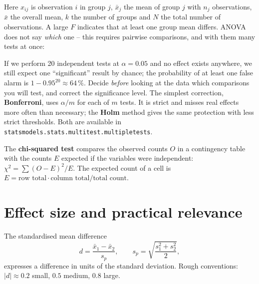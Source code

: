 \documentclass[
  letterpaper,
  DIV=11,
  numbers=noendperiod]{scrreprt}
\begin{document}
Here \(x_{ij}\) is observation \(i\) in group \(j\), \(\bar x_j\) the
mean of group \(j\) with \(n_j\) observations, \(\bar x\) the overall
mean, \(k\) the number of groups and \(N\) the total number of
observations. A large \(F\) indicates that at least one group mean
differs. ANOVA does not say \emph{which} one -- this requires pairwise
comparisons, and with them many tests at once:

\begin{tcolorbox}[enhanced jigsaw, left=2mm, title=\textcolor{quarto-callout-warning-color}{\faExclamationTriangle}\hspace{0.5em}{Pitfall: many tests, many false alarms}, opacityback=0, breakable, rightrule=.15mm, arc=.35mm, toptitle=1mm, colbacktitle=quarto-callout-warning-color!10!white, opacitybacktitle=0.6, coltitle=black, colframe=quarto-callout-warning-color-frame, bottomrule=.15mm, leftrule=.75mm, bottomtitle=1mm, titlerule=0mm, toprule=.15mm, colback=white]

If we perform 20 independent tests at \(\alpha = 0.05\) and no effect
exists anywhere, we still expect one ``significant'' result by chance;
the probability of at least one false alarm is
\(1 - 0.95^{20} \approx 64\,\%\). Decide \emph{before} looking at the
data which comparisons you will test, and correct the significance
level. The simplest correction, \textbf{Bonferroni}, uses \(\alpha/m\)
for each of \(m\) tests. It is strict and misses real effects more often
than necessary; the \textbf{Holm} method gives the same protection with
less strict thresholds. Both are available in
\texttt{statsmodels.stats.multitest.multipletests}.

\end{tcolorbox}

The \textbf{chi-squared test} compares the observed counts \(O\) in a
contingency table with the counts \(E\) expected if the variables were
independent: \(\chi^2 = \sum (O - E)^2/E\). The expected count of a cell
is
\(E = \text{row total} \cdot \text{column total} / \text{total count}\).

\section{Effect size and practical
relevance}\label{effect-size-and-practical-relevance}

\begin{tcolorbox}[enhanced jigsaw, left=2mm, title=\textcolor{quarto-callout-note-color}{\faInfo}\hspace{0.5em}{Definition: Cohen's d}, opacityback=0, breakable, rightrule=.15mm, arc=.35mm, toptitle=1mm, colbacktitle=quarto-callout-note-color!10!white, opacitybacktitle=0.6, coltitle=black, colframe=quarto-callout-note-color-frame, bottomrule=.15mm, leftrule=.75mm, bottomtitle=1mm, titlerule=0mm, toprule=.15mm, colback=white]

The standardised mean difference
\[d = \frac{\bar x_1 - \bar x_2}{s_p}, \qquad s_p = \sqrt{\frac{s_1^2 + s_2^2}{2}},\]
expresses a difference in units of the standard deviation. Rough
conventions: \(|d| \approx 0.2\) small, \(0.5\) medium, \(0.8\) large.

\end{tcolorbox}
\end{document}
